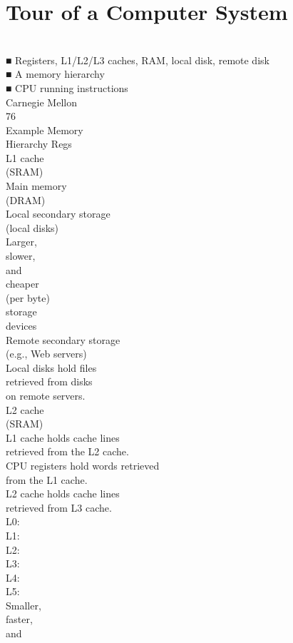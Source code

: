\documentclass[12pt]{article}
\begin{document}
\section{Tour of a Computer System}
\\
■ Registers, L1/L2/L3 caches, RAM, local disk, remote disk\\
■ A memory hierarchy\\
■ CPU running instructions\\
Carnegie Mellon\\
76\\
Example Memory \\
Hierarchy Regs\\
L1 cache \\
(SRAM)\\
Main memory\\
(DRAM)\\
Local secondary storage\\
(local disks)\\
Larger,  \\
slower, \\
and \\
cheaper \\
(per byte)\\
storage\\
devices\\
Remote secondary storage\\
(e.g., Web servers)\\
Local disks hold files \\
retrieved from disks \\
on remote servers.\\
L2 cache \\
(SRAM)\\
L1 cache holds cache lines \\
retrieved from the L2 cache.\\
CPU registers hold words retrieved \\
from the L1 cache.\\
L2 cache holds cache lines\\
retrieved from L3 cache.\\
L0:\\
L1:\\
L2:\\
L3:\\
L4:\\
L5:\\
Smaller,\\
faster,\\
and \\
\end{document}
